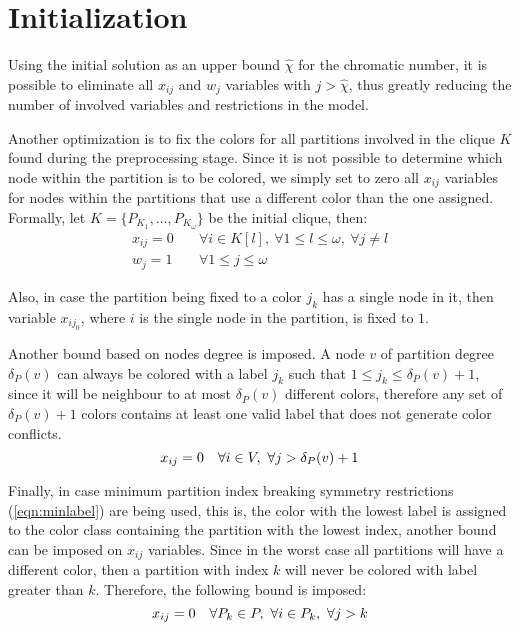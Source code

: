 \section{Initialization}

Using the initial solution as an upper bound $\hat{\chi}$ for the chromatic number, it is possible to eliminate all $x_{ij}$ and $w_j$ variables with $j > \hat{\chi}$, thus greatly reducing the number of involved variables and restrictions in the model.

Another optimization is to fix the colors for all partitions involved in the clique $K$ found during the preprocessing stage. Since it is not possible to determine which node within the partition is to be colored, we simply set to zero all $x_{ij}$ variables for nodes within the partitions that use a different color than the one assigned. Formally, let $K = \{ P_{K_1}, \ldots, P_{K_\omega} \}$ be the initial clique, then:
\begin{align*}
x_{ij} = 0 \quad &\forall i \in K[l],\ \forall 1 \leq l \leq \omega,\ \forall j \neq l \\
w_j = 1 \quad &\forall 1 \leq j \leq \omega
\end{align*}

Also, in case the partition being fixed to a color $j_k$ has a single node in it, then variable $x_{ij_0}$, where $i$ is the single node in the partition, is fixed to $1$.

Another bound based on nodes degree is imposed. A node $v$ of partition degree $\delta_P(v)$ can always be colored with a label $j_k$ such that $1 \leq j_k \leq \delta_P(v) + 1$, since it will be neighbour to at most $\delta_P(v)$ different colors, therefore any set of $\delta_P(v) + 1$ colors contains at least one valid label that does not generate color conflicts.  
\begin{equation*}
x_{ij} = 0 \quad \forall i \in V,\ \forall j > \delta_P(v) + 1 \\
\end{equation*}

Finally, in case minimum partition index breaking symmetry restrictions (\ref{eqn:minlabel}) are being used, this is, the color with the lowest label is assigned to the color class containing the partition with the lowest index, another bound can be imposed on $x_{ij}$ variables. Since in the worst case all partitions will have a different color, then a partition with index $k$ will never be colored with label greater than $k$. Therefore, the following bound is imposed:
\begin{equation*}
x_{ij} = 0 \quad \forall P_k \in P,\ \forall i \in P_k,\ \forall j > k \\
\end{equation*}

